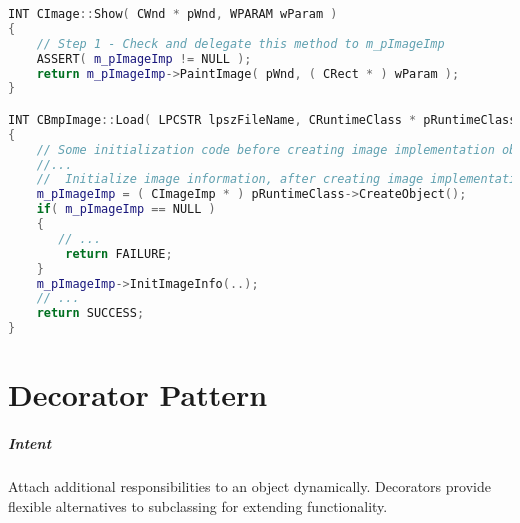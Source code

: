 \documentclass{book}
\begin{document}
\begin{lstlisting}[caption={Bridge Pattern sample Listing 2}, language=C++]
INT CImage::Show( CWnd * pWnd, WPARAM wParam )
{
    // Step 1 - Check and delegate this method to m_pImageImp
    ASSERT( m_pImageImp != NULL );
    return m_pImageImp->PaintImage( pWnd, ( CRect * ) wParam );
}

INT CBmpImage::Load( LPCSTR lpszFileName, CRuntimeClass * pRuntimeClass )
{
    // Some initialization code before creating image implementation object
    //...
    //  Initialize image information, after creating image implementation object
    m_pImageImp = ( CImageImp * ) pRuntimeClass->CreateObject();
    if( m_pImageImp == NULL )
    {
       // ...
        return FAILURE;
    }
    m_pImageImp->InitImageInfo(..);
    // ...
    return SUCCESS;
}
\end{lstlisting}



\chapter{Decorator Pattern}\label{DecoratorPattern}

\paragraph{Intent}
Attach additional responsibilities to an object dynamically.
Decorators provide flexible alternatives to subclassing for extending functionality. 

\begin{figure}[H]
\begin{floatrow}
\end{floatrow}
\end{figure}
\end{document}
